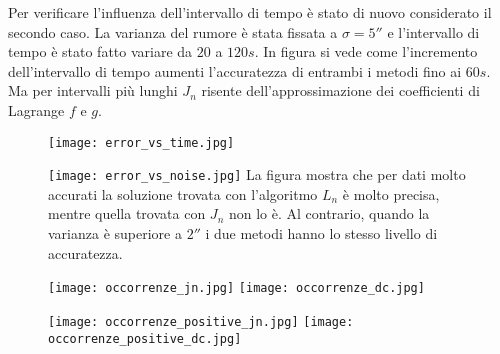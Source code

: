 \documentclass{beamer}
\begin{document}
\begin{frame}
Per verificare l'influenza dell'intervallo di tempo \`e stato di nuovo considerato il secondo caso. La varianza del rumore \`e stata fissata a $\sigma=5''$ e l'intervallo di tempo \`e stato fatto variare da $20$ a $120s$.
In figura si vede come l'incremento dell'intervallo di tempo aumenti l'accuratezza di entrambi i metodi fino ai $60s$. Ma per intervalli pi\`u lunghi $J_n$ risente dell'approssimazione dei coefficienti di Lagrange $f$ e $g$.
\begin{figure}
\centering
\texttt{[image: error\_vs\_time.jpg]}
\end{figure}
\end{frame}

\begin{frame}

\begin{figure}
\centering
\texttt{[image: error\_vs\_noise.jpg]}
La figura mostra che per dati molto accurati la soluzione trovata con l'algoritmo $L_n$ \`e molto precisa, mentre quella trovata con $J_n$ non lo \`e. 
Al contrario, quando la varianza \`e superiore a $2''$ i due metodi hanno lo stesso livello di accuratezza.   
\end{figure}

\end{frame}

\begin{frame}
\begin{figure} 
\centering
\texttt{[image: occorrenze\_jn.jpg]} 
\texttt{[image: occorrenze\_dc.jpg]} 
\end{figure}
\end{frame}
\begin{frame}
\begin{figure} 
\centering
\texttt{[image: occorrenze\_positive\_jn.jpg]} 
\texttt{[image: occorrenze\_positive\_dc.jpg]} 
\end{figure}
\end{frame}
\end{document}
